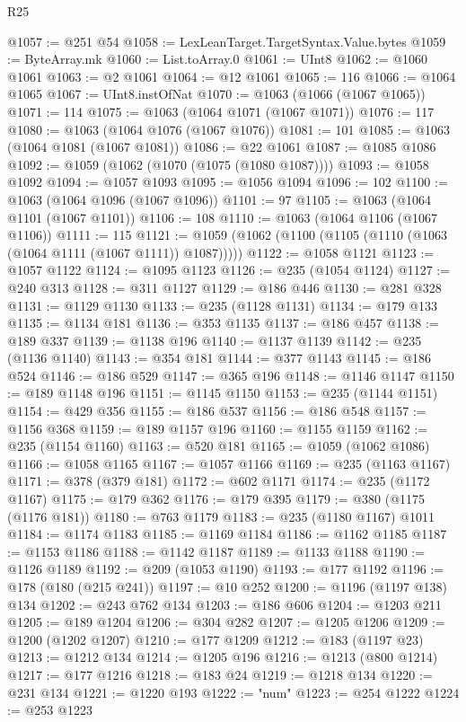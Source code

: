 \begin{lexlean}{R25}
\begin{coremodule}
@1057 := @251 @54
@1058 := LexLeanTarget.TargetSyntax.Value.bytes
@1059 := ByteArray.mk
@1060 := List.toArray.{0}
@1061 := UInt8
@1062 := @1060 @1061
@1063 := @2 @1061
@1064 := @12 @1061
@1065 := 116
@1066 := @1064 @1065
@1067 := UInt8.instOfNat
@1070 := @1063 (@1066 (@1067 @1065))
@1071 := 114
@1075 := @1063 (@1064 @1071 (@1067 @1071))
@1076 := 117
@1080 := @1063 (@1064 @1076 (@1067 @1076))
@1081 := 101
@1085 := @1063 (@1064 @1081 (@1067 @1081))
@1086 := @22 @1061
@1087 := @1085 @1086
@1092 := @1059 (@1062 (@1070 (@1075 (@1080 @1087))))
@1093 := @1058 @1092
@1094 := @1057 @1093
@1095 := @1056 @1094
@1096 := 102
@1100 := @1063 (@1064 @1096 (@1067 @1096))
@1101 := 97
@1105 := @1063 (@1064 @1101 (@1067 @1101))
@1106 := 108
@1110 := @1063 (@1064 @1106 (@1067 @1106))
@1111 := 115
@1121 := @1059 (@1062 (@1100 (@1105 (@1110 (@1063 (@1064 @1111 (@1067 @1111)) @1087)))))
@1122 := @1058 @1121
@1123 := @1057 @1122
@1124 := @1095 @1123
@1126 := @235 (@1054 @1124)
@1127 := @240 @313
@1128 := @311 @1127
@1129 := @186 @446
@1130 := @281 @328
@1131 := @1129 @1130
@1133 := @235 (@1128 @1131)
@1134 := @179 @133
@1135 := @1134 @181
@1136 := @353 @1135
@1137 := @186 @457
@1138 := @189 @337
@1139 := @1138 @196
@1140 := @1137 @1139
@1142 := @235 (@1136 @1140)
@1143 := @354 @181
@1144 := @377 @1143
@1145 := @186 @524
@1146 := @186 @529
@1147 := @365 @196
@1148 := @1146 @1147
@1150 := @189 @1148 @196
@1151 := @1145 @1150
@1153 := @235 (@1144 @1151)
@1154 := @429 @356
@1155 := @186 @537
@1156 := @186 @548
@1157 := @1156 @368
@1159 := @189 @1157 @196
@1160 := @1155 @1159
@1162 := @235 (@1154 @1160)
@1163 := @520 @181
@1165 := @1059 (@1062 @1086)
@1166 := @1058 @1165
@1167 := @1057 @1166
@1169 := @235 (@1163 @1167)
@1171 := @378 (@379 @181)
@1172 := @602 @1171
@1174 := @235 (@1172 @1167)
@1175 := @179 @362
@1176 := @179 @395
@1179 := @380 (@1175 (@1176 @181))
@1180 := @763 @1179
@1183 := @235 (@1180 @1167) @1011
@1184 := @1174 @1183
@1185 := @1169 @1184
@1186 := @1162 @1185
@1187 := @1153 @1186
@1188 := @1142 @1187
@1189 := @1133 @1188
@1190 := @1126 @1189
@1192 := @209 (@1053 @1190)
@1193 := @177 @1192
@1196 := @178 (@180 (@215 @241))
@1197 := @10 @252
@1200 := @1196 (@1197 @138) @134
@1202 := @243 @762 @134
@1203 := @186 @606
@1204 := @1203 @211
@1205 := @189 @1204
@1206 := @304 @282
@1207 := @1205 @1206
@1209 := @1200 (@1202 @1207)
@1210 := @177 @1209
@1212 := @183 (@1197 @23)
@1213 := @1212 @134
@1214 := @1205 @196
@1216 := @1213 (@800 @1214)
@1217 := @177 @1216
@1218 := @183 @24
@1219 := @1218 @134
@1220 := @231 @134
@1221 := @1220 @193
@1222 := "num"
@1223 := @254 @1222
@1224 := @253 @1223

\end{coremodule}
\end{lexlean}
